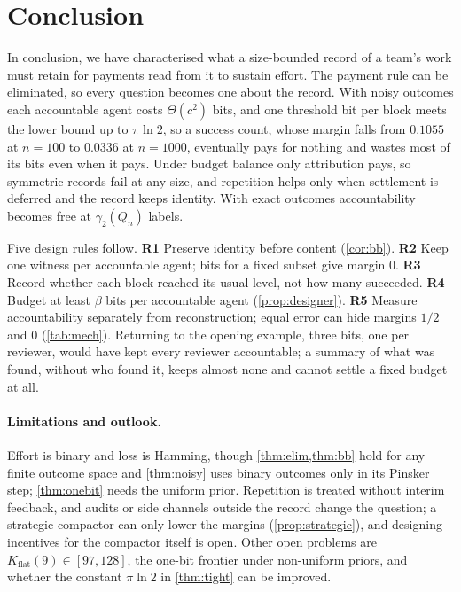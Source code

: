 \documentclass[sigconf,anonymous,acmthm=false]{acmart}
\theoremstyle{acmplain}
\theoremstyle{acmdefinition}
\newcommand{\Kflat}{K_{\mathrm{flat}}}
\begin{document}
\section{Conclusion}\label{sec:conclusion}

In conclusion, we have characterised what a size-bounded record of a team's work must retain
for payments read from it to sustain effort. The payment rule can be eliminated, so every
question becomes one about the record. With noisy outcomes each accountable agent costs
$\Theta(c^2)$ bits, and one threshold bit per block meets the lower bound up to $\pi\ln2$, so
a success count, whose margin falls from $0.1055$ at $n=100$ to $0.0336$ at $n=1000$,
eventually pays for nothing and wastes most of its bits even when it pays.
Under budget balance only attribution pays, so symmetric records fail at any size, and
repetition helps only when settlement is deferred and the record keeps identity. With exact
outcomes accountability becomes free at $\gamma_2(Q_n)$ labels.

Five design rules follow. \textbf{R1} Preserve identity before content (\cref{cor:bb}).
\textbf{R2} Keep one witness per accountable agent; bits for a fixed subset give margin 0.
\textbf{R3} Record whether each block reached its usual level, not how many succeeded. \textbf{R4} Budget at least $\beta$ bits per
accountable agent (\cref{prop:designer}). \textbf{R5} Measure accountability separately from
reconstruction; equal error can hide margins $1/2$ and 0 (\cref{tab:mech}). Returning to the
opening example, three bits, one per reviewer, would have kept every reviewer accountable;
a summary of what was found, without who found it, keeps almost none and cannot settle a fixed budget at all.

\paragraph{Limitations and outlook.} Effort is binary and loss is Hamming, though
\cref{thm:elim,thm:bb} hold for any finite outcome space and \cref{thm:noisy} uses binary
outcomes only in its Pinsker step; \cref{thm:onebit} needs the uniform prior. Repetition is
treated without interim feedback, and audits or side channels outside the record change the
question; a strategic compactor can only lower the margins
(\cref{prop:strategic}), and designing incentives for the compactor itself is open. Other open
problems are $\Kflat(9)\in[97,128]$, the one-bit frontier under non-uniform priors, and
whether the constant $\pi\ln2$ in \cref{thm:tight} can be improved.

\label{endbody}\clearpage


\end{document}
